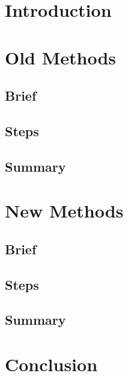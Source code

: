 \documentclass{article}
\begin{document}
\section{Introduction}
\lipsum[1-2]


\section{Old Methods}

\subsection{Brief}
\lipsum[1-1]

\subsection{Steps}
\lipsum[1-3]

\subsection{Summary}
\lipsum[1-1]


\section{New Methods}

\subsection{Brief}
\lipsum[1-1]

\subsection{Steps}
\lipsum[1-3]

\subsection{Summary}
\lipsum[1-1]


\section{Conclusion}
\lipsum[1-1]
\end{document}

